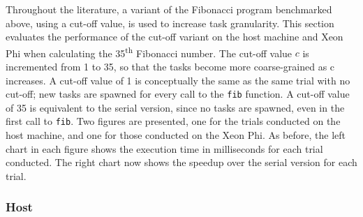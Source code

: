 \documentclass{report}
\begin{document}
Throughout the literature, a variant of the Fibonacci program benchmarked above, using a cut-off value, is used to increase task granularity. This section evaluates the performance of the cut-off variant on the host machine and Xeon Phi when calculating the 35\textsuperscript{th} Fibonacci number. The cut-off value \(c\) is incremented from 1 to 35, so that the tasks become more coarse-grained as c increases. A cut-off value of 1 is conceptually the same as the same trial with no cut-off; new tasks are spawned for every call to the \verb!fib! function. A cut-off value of 35 is equivalent to the serial version, since no tasks are spawned, even in the first call to \verb!fib!. Two figures are presented, one for the trials conducted on the host machine, and one for those conducted on the Xeon Phi. As before, the left chart in each figure shows the execution time in milliseconds for each trial conducted. The right chart now shows the speedup over the serial version for each trial.

\subsubsection{Host}
\end{document}
